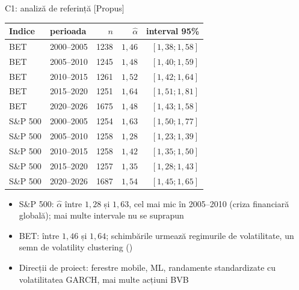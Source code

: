 \ifsolutions
\begin{frame}{C1: analiză de referință [Propus]}
\itemsize{\scriptsize}
\begin{center}
\scriptsize
\begin{tabular}{llrrr}
\toprule
Indice & perioada & $n$ & $\hat\alpha$ & interval 95\% \\
\midrule
BET & 2000--2005 & 1238 & $1{,}46$ & $[1{,}38; 1{,}58]$ \\
BET & 2005--2010 & 1245 & $1{,}48$ & $[1{,}40; 1{,}59]$ \\
BET & 2010--2015 & 1261 & $1{,}52$ & $[1{,}42; 1{,}64]$ \\
BET & 2015--2020 & 1251 & $1{,}64$ & $[1{,}51; 1{,}81]$ \\
BET & 2020--2026 & 1675 & $1{,}48$ & $[1{,}43; 1{,}58]$ \\
S\&P 500 & 2000--2005 & 1254 & $1{,}63$ & $[1{,}50; 1{,}77]$ \\
S\&P 500 & 2005--2010 & 1258 & $1{,}28$ & $[1{,}23; 1{,}39]$ \\
S\&P 500 & 2010--2015 & 1258 & $1{,}42$ & $[1{,}35; 1{,}50]$ \\
S\&P 500 & 2015--2020 & 1257 & $1{,}35$ & $[1{,}28; 1{,}43]$ \\
S\&P 500 & 2020--2026 & 1687 & $1{,}54$ & $[1{,}45; 1{,}65]$ \\
\bottomrule
\end{tabular}
\end{center}
\begin{itemize}
    \item S\&P 500: $\hat\alpha$ între $1{,}28$ și $1{,}63$, cel mai mic în 2005--2010 (criza financiară globală); mai multe intervale nu se suprapun
    \item BET: între $1{,}46$ și $1{,}64$; schimbările urmează regimurile de volatilitate, un semn de volatility clustering ()
    \item Direcții de proiect: ferestre mobile, ML, randamente standardizate cu volatilitatea GARCH, mai multe acțiuni BVB
\end{itemize}
\end{frame}
\fi

